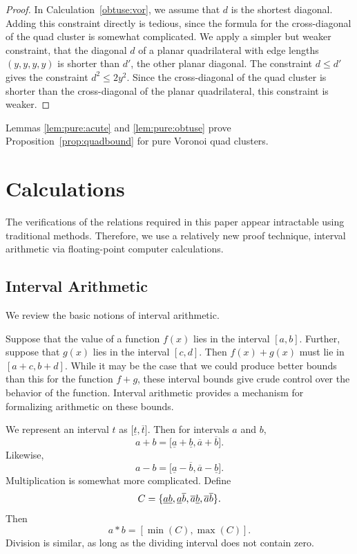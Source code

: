 \begin{proof}
In Calculation~\ref{obtuse:vor}, we assume that $d$ is the shortest diagonal.
Adding this constraint directly is tedious, since the
formula for the cross-diagonal of the quad cluster is somewhat
complicated.  We apply a simpler but weaker constraint,
that the diagonal $d$ of a planar quadrilateral
with edge lengths $(y,y,y,y)$ is shorter than $d'$, the other planar
diagonal.  The constraint $d \le d'$ gives the constraint $d^2 \le 2 y^2$.
Since the cross-diagonal of the quad cluster is shorter than the
cross-diagonal of the planar quadrilateral, this constraint is weaker.
\end{proof}

Lemmas \ref{lem:pure:acute} and \ref{lem:pure:obtuse} prove
Proposition~\ref{prop:quadbound} for pure Voronoi quad clusters.

\chapter{Calculations}

The verifications of the relations required in this paper
appear intractable using
traditional methods.  Therefore, we use a relatively new proof technique,
interval arithmetic via floating-point computer calculations.

\section{Interval Arithmetic}

We review the basic notions of interval arithmetic.

Suppose that the value of a function $f(x)$ lies in the interval
$[a,b]$.  Further, suppose that $g(x)$ lies in the interval $[c,d]$.
Then $f(x) + g(x)$ must lie in $[a+c,b+d]$.  While it may be the case
that we could produce better bounds than this for the function $f + g$,
these interval bounds give crude control over the behavior of the
function.  Interval arithmetic provides a mechanism for formalizing
arithmetic on these bounds.

We represent an interval $t$ as $\big[\underline{t},\overline{t}\big]$.
Then for intervals $a$ and $b$,
\[
a + b = \big[\underline{a} + \underline{b}, \overline{a} + \overline{b}\big].
\]
Likewise,
\[
a - b = \big[\underline{a} - \overline{b}, \overline{a} - \underline{b}\big].
\]
Multiplication is somewhat more complicated.  Define
\[
C = \{\underline{a} \/ \underline{b}, \underline{a} \overline{b},
    \overline{a} \underline{b}, \overline{a} \overline{b}\}.
\]
Then
\[
a*b = [\min(C), \max(C)].
\]
Division is similar, as long as the dividing interval does not contain zero.

